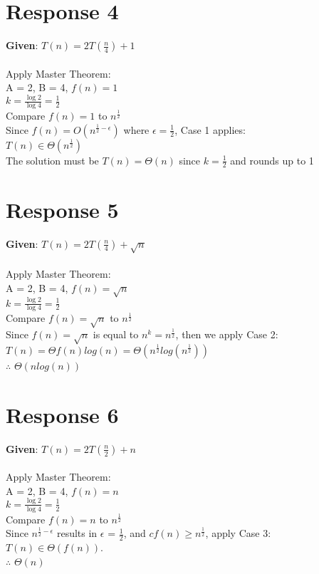 \documentclass[12pt, a4paper]{article}
\begin{document}
\section*{\centering Response 4}
    \textbf{Given}: \(T(n) = 2T(\frac{n}{4}) + 1\)\\
    \\
    Apply Master Theorem:\\
    A = 2, B = 4, \(f(n) = 1\)\\
    \(k = \frac{\log{2}}{\log{4}} = \frac{1}{2}\)\\
    Compare \(f(n) = 1\) to \(n^{\frac{1}{2}}\)\\
    Since \(f(n) = O(n^{\frac{1}{2} - \epsilon})\) where \(\epsilon = \frac{1}{2}\), Case 1 applies:\\
    \(T(n) \in \Theta{(n^{\frac{1}{2}})}\)\\
    The solution must be \(T(n) = \Theta{(n)}\) since \(k = \frac{1}{2}\) and rounds up to 1


\section*{\centering Response 5}
    \textbf{Given}: \(T(n) = 2T(\frac{n}{4}) + \sqrt{n}\)\\
    \\
    Apply Master Theorem:\\
    A = 2, B = 4, \(f(n) = \sqrt{n}\)\\
    \(k = \frac{\log{2}}{\log{4}} = \frac{1}{2}\)\\
    Compare \(f(n) = \sqrt{n}\) to \(n^{\frac{1}{2}}\)\\
    Since \(f(n) = \sqrt{n}\) is equal to \(n^k = n^{\frac{1}{2}}\), then we apply Case 2:\\
    \(T(n) = \Theta{f(n)log(n)} = \Theta{(n^{\frac{1}{2}}log(n^{\frac{1}{2}}))}\)\\
    $\therefore$ \(\Theta{(nlog(n))}\)

\section*{\centering Response 6}
    \textbf{Given}: \(T(n)=2T(\frac{n}{2}) + n\)\\
    \\
    Apply Master Theorem:\\
    A = 2, B = 4, \(f(n) = n\)\\
    \(k = \frac{\log{2}}{\log{4}} = \frac{1}{2}\)\\
    Compare \(f(n) = n\) to \(n^{\frac{1}{2}}\)\\
    Since \(n^{\frac{1}{2} - \epsilon}\) results in $\epsilon$ = $\frac{1}{2}$, and \(cf(n) \geq n^{\frac{1}{2}}\), apply Case 3:\\
    \(T(n) \in \Theta{(f(n))}\).\\
    $\therefore$ $\Theta{(n)}$\\
\end{document}
